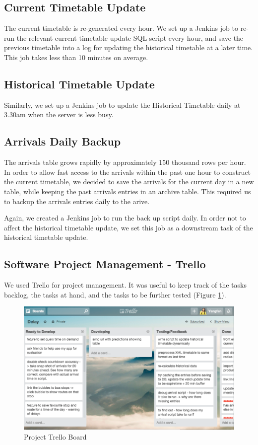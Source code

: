 \subsection{Current Timetable Update}
\par The current timetable is re-generated every hour. We set up a Jenkins job to re-run the relevant current timetable update SQL script every hour, and save the previous timetable into a log for updating the historical timetable at a later time. This job takes less than 10 minutes on average.

\subsection{Historical Timetable Update}
\par Similarly, we set up a Jenkins job to update the Historical Timetable daily at 3.30am when the server is less busy.

\subsection{Arrivals Daily Backup}
\par The arrivals table grows rapidly by approximately 150 thousand rows per hour. In order to allow fast access to the arrivals within the past one hour to construct the current timetable, we decided to save the arrivals for the current day in a new table, while keeping the past arrivals entries in an archive table. This required us to backup the arrivals entries daily to the arive.

\par Again, we created a Jenkins job to run the back up script daily. In order not to affect the historical timetable update, we set this job as a downstream task of the historical timetable update.

\subsection{Software Project Management - Trello}
\par We used Trello \cite{trello} for project management. It was useful to keep track of the tasks backlog, the tasks at hand, and the tasks to be further tested (Figure \ref{fig:trello}).

\begin{figure}
\centering
\includegraphics[width=\textwidth]{figures/trello_small.png}
\caption{\label{fig:trello} Project Trello Board}
\end{figure}
